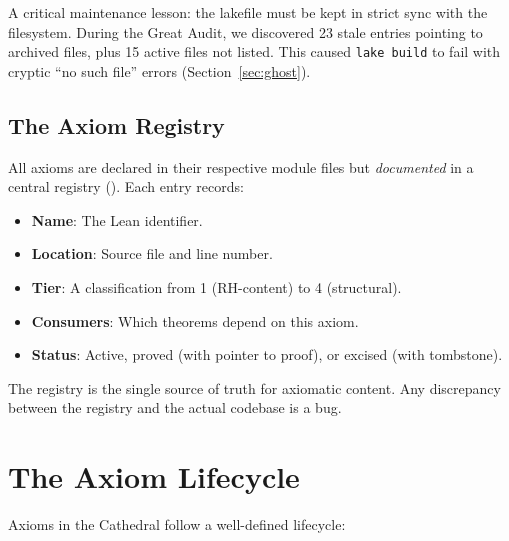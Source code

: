 \documentclass[11pt,a4paper]{article}
\begin{document}
A critical maintenance lesson: the lakefile must be kept in strict
sync with the filesystem. During the Great Audit, we discovered 23
stale entries pointing to archived files, plus 15 active files not
listed. This caused \texttt{lake build} to fail with cryptic
``no such file'' errors (Section~\ref{sec:ghost}).

\subsection{The Axiom Registry}

All axioms are declared in their respective module files but
\emph{documented} in a central registry ().
Each entry records:

\begin{itemize}
  \item \textbf{Name}: The Lean identifier.
  \item \textbf{Location}: Source file and line number.
  \item \textbf{Tier}: A classification from 1 (RH-content) to
    4 (structural).
  \item \textbf{Consumers}: Which theorems depend on this axiom.
  \item \textbf{Status}: Active, proved (with pointer to proof), or
    excised (with tombstone).
\end{itemize}

The registry is the single source of truth for axiomatic content.
Any discrepancy between the registry and the actual codebase is a
bug.

\section{The Axiom Lifecycle}
\label{sec:axiom-lifecycle}

Axioms in the Cathedral follow a well-defined lifecycle:

\begin{center}
\end{center}
\end{document}
